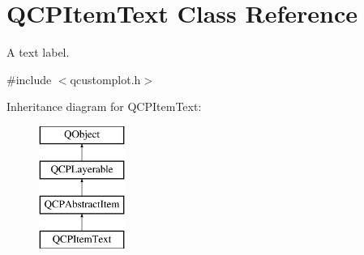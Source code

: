 \hypertarget{class_q_c_p_item_text}{}\section{Q\+C\+P\+Item\+Text Class Reference}
\label{class_q_c_p_item_text}


A text label.  




{\ttfamily \#include $<$qcustomplot.\+h$>$}

Inheritance diagram for Q\+C\+P\+Item\+Text\+:\begin{figure}[H]
\begin{center}
\leavevmode
\includegraphics[height=4.000000cm]{d7/da0/class_q_c_p_item_text}
\end{center}
\end{figure}
